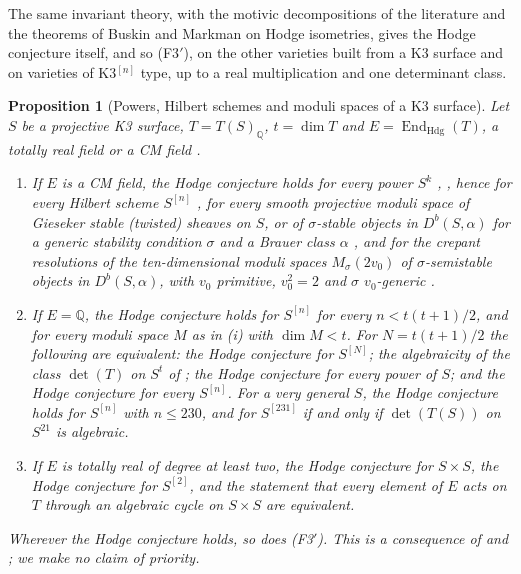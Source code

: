 \documentclass[11pt,reqno]{amsart}
\theoremstyle{plain}
\newtheorem{proposition}[theorem]{Proposition}
\theoremstyle{definition}
\theoremstyle{remark}
\newcommand{\QQ}{\mathbb{Q}}
\DeclareMathOperator{\End}{End}
\begin{document}
The same invariant theory, with the motivic decompositions of the
literature and the theorems of Buskin and Markman on Hodge isometries, gives
the Hodge conjecture itself, and so \textup{(F3$'$)}, on the other varieties
built from a K3 surface and on varieties of K3$^{[n]}$ type, up to a real
multiplication and one determinant class.

\begin{proposition}[Powers, Hilbert schemes and moduli spaces of a K3
surface]\label{prop:k3powers}
Let $S$ be a projective K3 surface, $T=T(S)_{\QQ}$, $t=\dim T$ and
$E=\End_{\mathrm{Hdg}}(T)$, a totally real field or a CM field \cite{Zar83}.
\begin{enumerate}[label=\textup{(\roman*)},leftmargin=2.6em,itemsep=2pt]
\item If $E$ is a CM field, the Hodge conjecture holds for every power
  $S^{k}$ \cite[Theorem~5.4]{RM08}, \cite{Bus19}, hence for every Hilbert
  scheme $S^{[n]}$ \cite{dCM02}, for every smooth projective moduli space of
  Gieseker stable (twisted) sheaves on $S$, or of $\sigma$-stable objects in
  $D^{b}(S,\alpha)$ for a generic stability condition $\sigma$ and a Brauer
  class $\alpha$ \cite[Theorem~0.1, Remark~2.1]{Bue20}, and for the crepant
  resolutions of the ten-dimensional moduli spaces $M_{\sigma}(2v_{0})$ of
  $\sigma$-semistable objects in $D^{b}(S,\alpha)$, with $v_{0}$ primitive,
  $v_{0}^{2}=2$ and $\sigma$ $v_{0}$-generic \cite[Theorem~1.3]{FFZ21}.
\item If $E=\QQ$, the Hodge conjecture holds for $S^{[n]}$ for every
  $n<t(t+1)/2$, and for every moduli space $M$ as in \textup{(i)} with
  $\dim M<t$. For $N=t(t+1)/2$ the following are equivalent: the Hodge
  conjecture for $S^{[N]}$; the algebraicity of the class $\det(T)$ on $S^{t}$
  of ; the Hodge conjecture for every power of $S$; and
  the Hodge conjecture for every $S^{[n]}$. For a very general $S$, the Hodge
  conjecture holds for $S^{[n]}$ with $n\le230$, and for $S^{[231]}$ if and
  only if $\det(T(S))$ on $S^{21}$ is algebraic.
\item If $E$ is totally real of degree at least two, the Hodge conjecture for
  $S\times S$, the Hodge conjecture for $S^{[2]}$, and the statement that
  every element of $E$ acts on $T$ through an algebraic cycle on $S\times S$
  are equivalent.
\end{enumerate}
Wherever the Hodge conjecture holds, so does \textup{(F3$'$)}. This is a
consequence of \cite{RM08,Bus19,dCM02,Bue20,FFZ21} and
; we make no claim of priority.
\end{proposition}
\end{document}
